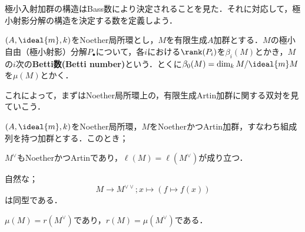 極小入射加群の構造はBass数により決定されることを見た．それに対応して，極小射影分解の構造を決定する数を定義しよう．
\begin{defi}[Betti数]
	$(A,\ideal{m},k)$をNoether局所環とし，$M$を有限生成$A$加群とする．$M$の極小自由（極小射影）分解$P_\bullet$について，各$i$における$\rank(P_i)$を$\beta_i(M)$とかき，$M$の$i$次の\textbf{Betti数(Betti number)}という．とくに$\beta_0(M)=\dim_k M/\ideal{m}M$を$\mu(M)$とかく．
\end{defi}

これによって，まずはNoether局所環上の，有限生成Artin加群に関する双対を見ていこう．

\begin{prop}[NoetherかつArtin加群についての双対定理]\label{prop:Artin加群においての双対定理}
	$(A,\ideal{m},k)$をNoether局所環，$M$をNoetherかつArtin加群，すなわち組成列を持つ加群とする．このとき；
	\begin{sakura}
		\item $M^\vee$もNoetherかつArtinであり，$\ell(M)=\ell(M^\vee)$が成り立つ．
		\item 自然な；
		\[M\to M^{\vee\vee};x\mapsto(f\mapsto f(x))\]
		は同型である．
		\item $\mu(M)=r(M^\vee)$であり，$r(M)=\mu(M^\vee)$である．
	\end{sakura}
\end{prop}

